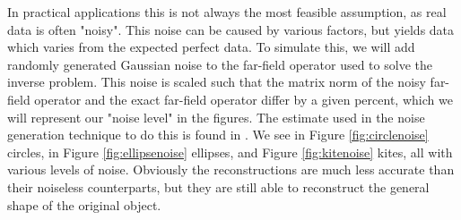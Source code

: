 \documentclass[]{article}
\begin{document}
			In practical applications this is not always the most feasible assumption, as real data is often "noisy". This noise can be caused by various factors, but yields data which varies from the expected perfect data. To simulate this, we will add randomly generated Gaussian noise to the far-field operator used to solve the inverse problem. This noise is scaled such that the matrix norm of the noisy far-field operator and the exact far-field operator differ by a given percent, which we will represent our "noise level" in the figures. The estimate used in the noise generation technique to do this is found in \cite{hansen1988}. We see in Figure \ref{fig:circlenoise} circles, in Figure \ref{fig:ellipsenoise} ellipses, and Figure \ref{fig:kitenoise} kites, all with various levels of noise. Obviously the reconstructions are much less accurate than their noiseless counterparts, but they are still able to reconstruct the general shape of the original object.
\end{document}

